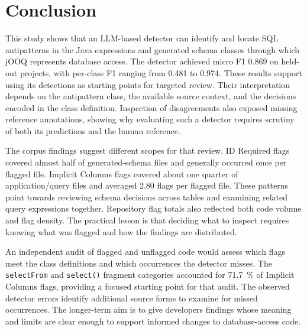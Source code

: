 \section{Conclusion}\label{sec:conclusion}

This study shows that an LLM-based detector can identify and locate SQL antipatterns in the Java expressions and generated schema classes through which jOOQ represents database access. The detector achieved micro F1 \num{0.869} on held-out projects, with per-class F1 ranging from \num{0.481} to \num{0.974}. These results support using its detections as starting points for targeted review. Their interpretation depends on the antipattern class, the available source context, and the decisions encoded in the class definition. Inspection of disagreements also exposed missing reference annotations, showing why evaluating such a detector requires scrutiny of both its predictions and the human reference.

The corpus findings suggest different scopes for that review. ID Required flags covered almost half of generated-schema files and generally occurred once per flagged file. Implicit Columns flags covered about one quarter of application/query files and averaged \num{2.80} flags per flagged file. These patterns point towards reviewing schema decisions across tables and examining related query expressions together. Repository flag totals also reflected both code volume and flag density. The practical lesson is that deciding what to inspect requires knowing what was flagged and how the findings are distributed.

An independent audit of flagged and unflagged code would assess which flags meet the class definitions and which occurrences the detector misses. The \texttt{selectFrom} and \texttt{select()} fragment categories accounted for \qty{71.7}{\percent} of Implicit Columns flags, providing a focused starting point for that audit. The observed detector errors identify additional source forms to examine for missed occurrences. The longer-term aim is to give developers findings whose meaning and limits are clear enough to support informed changes to database-access code.
